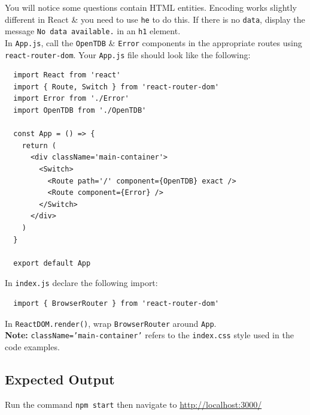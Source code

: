 \documentclass{article}
\begin{document}
You will notice some questions contain HTML entities. Encoding works slightly different in React \& you need to use \texttt{he} to do this. If there is no \texttt{data}, display the message \texttt{No data available.} in an \texttt{h1} element. \\

In \texttt{App.js}, call the \texttt{OpenTDB} \& \texttt{Error} components in the appropriate routes using \texttt{react-router-dom}. Your \texttt{App.js} file should look like the following:

\begin{verbatim}
  import React from 'react'
  import { Route, Switch } from 'react-router-dom'
  import Error from './Error'
  import OpenTDB from './OpenTDB'
  
  const App = () => {
    return (
      <div className='main-container'>
        <Switch>
          <Route path='/' component={OpenTDB} exact />
          <Route component={Error} />
        </Switch>
      </div>
    )
  }
  
  export default App  
\end{verbatim}

In \texttt{index.js} declare the following import:

\begin{verbatim}
  import { BrowserRouter } from 'react-router-dom'
\end{verbatim}

In \texttt{ReactDOM.render()}, wrap \texttt{BrowserRouter} around \texttt{App}. \\

\textbf{Note:} \texttt{className='main-container'} refers to the \texttt{index.css} style used in the code examples.

\subsection*{Expected Output} 
Run the command \texttt{npm start} then navigate to \href{http://localhost:3000/}{http://localhost:3000/} \\
\end{document}
